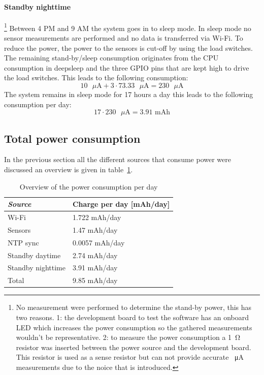 \documentclass[11pt,a4paper]{article}
\begin{document}
\paragraph{Standby nighttime}\footnote{No measurement were performed to determine the stand-by power, this has two reasons. 1: the development board to test the software has an onboard LED which increases the power consumption so the gathered measurements wouldn't be representative. 2: to measure the power consumption a \SI{1}{\ohm} resistor was inserted between the power source and the development board. This resistor is used as a sense resistor but can not provide accurate \SI{}{\micro\ampere} measurements due to the noice that is introduced. }
Between 4 PM and 9 AM the system goes in to sleep mode. In sleep mode no sensor measurements are performed and no data is transferred via Wi-Fi. To reduce the power, the power to the sensors is cut-off by using the load switches. The remaining stand-by/sleep consumption originates from the CPU consumption in deepsleep and the three GPIO pins that are kept high to drive the load switches. This leads to the following consumption:
\begin{equation}
	10 \text{ }\mu\text{A} + 3\cdot 73.33\text{ }\mu\text{A} = 230\text{ }\mu\text{A}
\end{equation}
The system remains in sleep mode for 17 hours a day this leads to the following consumption per day:
\begin{equation}
	17 \cdot 230\text{ }\mu\text{A}= 3.91\text{ mAh}
\end{equation}

\subsection{Total power consumption}
In the previous section all the different sources that consume power were discussed an overview is given in table~\ref{tab:pwr}.

\begin{table}[H]
	\centering
	\begin{tabular}{|l|l|}
	\hline
	\textit{\textbf{Source}} & \textbf{Charge per day {[}mAh/day{]}} \\ \hline
	Wi-Fi                    & 1.722 mAh/day                         \\ \hline
	Sensors                  & 1.47 mAh/day                          \\ \hline
	NTP sync                 & 0.0057 mAh/day                        \\ \hline
	Standby daytime          & 2.74 mAh/day                          \\ \hline
	Standby nighttime        & 3.91 mAh/day                          \\ \hline
	\rowcolor{Gray}
	Total                    & 9.85 mAh/day  						 \\ \hline
	\end{tabular}
	\captionsetup{justification=centering}
	\caption{Overview of the power consumption per day}
	\label{tab:pwr}
\end{table}
\end{document}
